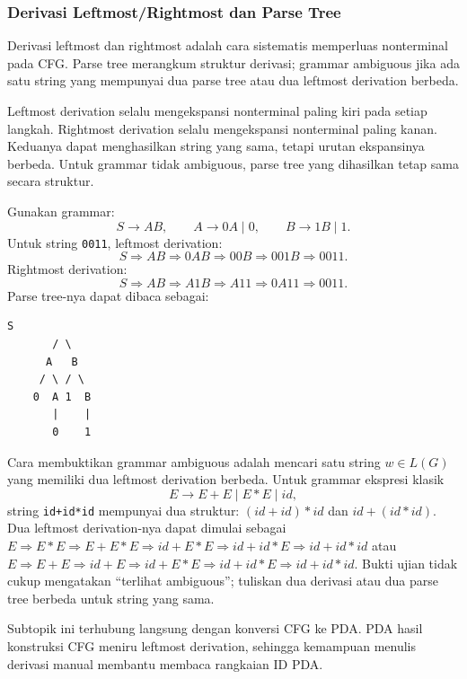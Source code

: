 \subsubsection{Derivasi Leftmost/Rightmost dan Parse Tree}

\begin{jawab}
Derivasi leftmost dan rightmost adalah cara sistematis memperluas nonterminal pada CFG. Parse tree merangkum struktur derivasi; grammar ambiguous jika ada satu string yang mempunyai dua parse tree atau dua leftmost derivation berbeda.
\end{jawab}

Leftmost derivation selalu mengekspansi nonterminal paling kiri pada setiap langkah. Rightmost derivation selalu mengekspansi nonterminal paling kanan. Keduanya dapat menghasilkan string yang sama, tetapi urutan ekspansinya berbeda. Untuk grammar tidak ambiguous, parse tree yang dihasilkan tetap sama secara struktur.

Gunakan grammar:
\[
    S\rightarrow AB,\qquad A\rightarrow 0A\mid 0,\qquad B\rightarrow 1B\mid 1.
\]
Untuk string \texttt{0011}, leftmost derivation:
\[
    S\Rightarrow AB\Rightarrow 0AB\Rightarrow 00B\Rightarrow 001B\Rightarrow 0011.
\]
Rightmost derivation:
\[
    S\Rightarrow AB\Rightarrow A1B\Rightarrow A11\Rightarrow 0A11\Rightarrow 0011.
\]
Parse tree-nya dapat dibaca sebagai:
\begin{lstlisting}[caption={Parse tree untuk 0011}]
        S
       / \
      A   B
     / \ / \
    0  A 1  B
       |    |
       0    1
\end{lstlisting}

Cara membuktikan grammar ambiguous adalah mencari satu string $w\in L(G)$ yang memiliki dua leftmost derivation berbeda. Untuk grammar ekspresi klasik
\[
    E\rightarrow E+E\mid E*E\mid id,
\]
string \texttt{id+id*id} mempunyai dua struktur: $(id+id)*id$ dan $id+(id*id)$. Dua leftmost derivation-nya dapat dimulai sebagai $E\Rightarrow E*E\Rightarrow E+E*E\Rightarrow id+E*E\Rightarrow id+id*E\Rightarrow id+id*id$ atau $E\Rightarrow E+E\Rightarrow id+E\Rightarrow id+E*E\Rightarrow id+id*E\Rightarrow id+id*id$. Bukti ujian tidak cukup mengatakan ``terlihat ambiguous''; tuliskan dua derivasi atau dua parse tree berbeda untuk string yang sama.

Subtopik ini terhubung langsung dengan konversi CFG ke PDA. PDA hasil konstruksi CFG meniru leftmost derivation, sehingga kemampuan menulis derivasi manual membantu membaca rangkaian ID PDA.

